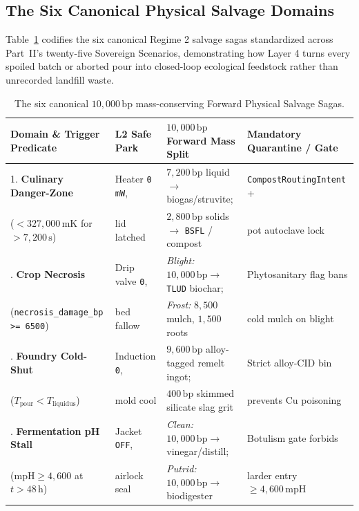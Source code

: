 \subsection{The Six Canonical Physical Salvage Domains}

Table~\ref{tab:six-domain-salvage-sagas} codifies the six canonical Regime 2 salvage sagas
standardized across Part~II's twenty-five Sovereign Scenarios, demonstrating how Layer 4 turns
every spoiled batch or aborted pour into closed-loop ecological feedstock rather than unrecorded
landfill waste.

\begin{table}[htbp]
\centering
\caption{The six canonical $10{,}000\,\mathrm{bp}$ mass-conserving Forward Physical Salvage Sagas.}
\label{tab:six-domain-salvage-sagas}
\footnotesize
\begin{tabular}{@{}llll@{}}
\toprule
\textbf{Domain \& Trigger Predicate} & \textbf{L2 Safe Park} & \textbf{$10{,}000\,\mathrm{bp}$ Forward Mass Split} & \textbf{Mandatory Quarantine / Gate} \\
\midrule
1. \textbf{Culinary Danger-Zone} & Heater \texttt{0 mW}, & $7{,}200\,\mathrm{bp}$ liquid $\to$ biogas/struvite; & \texttt{CompostRoutingIntent} + \\
($< 327{,}000\,\mathrm{mK}$ for $> 7{,}200\,\mathrm{s}$) & lid latched & $2{,}800\,\mathrm{bp}$ solids $\to$ \texttt{BSFL} / compost & pot autoclave lock \\
\addlinespace[2pt]
2. \textbf{Crop Necrosis} & Drip valve \texttt{0}, & \emph{Blight:} $10{,}000\,\mathrm{bp} \to$ \texttt{TLUD} biochar; & Phytosanitary flag bans \\
(\texttt{necrosis\_damage\_bp >= 6500}) & bed fallow & \emph{Frost:} $8{,}500$ mulch, $1{,}500$ roots & cold mulch on blight \\
\addlinespace[2pt]
3. \textbf{Foundry Cold-Shut} & Induction \texttt{0}, & $9{,}600\,\mathrm{bp}$ alloy-tagged remelt ingot; & Strict alloy-CID bin \\
($T_{\mathrm{pour}} < T_{\mathrm{liquidus}}$) & mold cool & $400\,\mathrm{bp}$ skimmed silicate slag grit & prevents $\mathrm{Cu}$ poisoning \\
\addlinespace[2pt]
4. \textbf{Fermentation pH Stall} & Jacket \texttt{OFF}, & \emph{Clean:} $10{,}000\,\mathrm{bp} \to$ vinegar/distill; & Botulism gate forbids \\
($\mathrm{mpH} \ge 4{,}600$ at $t > 48\,\mathrm{h}$) & airlock seal & \emph{Putrid:} $10{,}000\,\mathrm{bp} \to$ biodigester & larder entry $\ge 4{,}600\,\mathrm{mpH}$ \\

\end{tabular}
\end{table}
